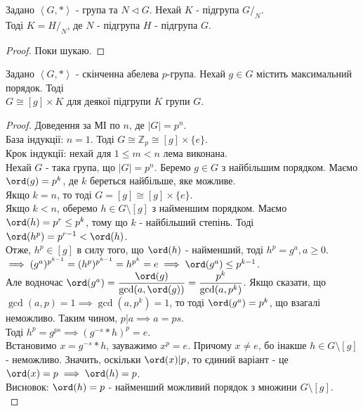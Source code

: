 \documentclass{math_library}
\begin{document}
\begin{lemma}
Задано $\left< G,*\right>$ - група та $N \triangleleft G$. Нехай $K$ - підгрупа $G/_N$. \\
Тоді $K = H/_N$, де $N$ - підгрупа $H$ - підгрупа $G$.
\end{lemma}

\begin{proof}
Поки шукаю.
\end{proof}

\begin{lemma}
Задано $\left< G, * \right>$ - скінченна абелева $p$-група. Нехай $g \in G$ містить максимальний порядок. Тоді\\
$G \cong [g] \times K$ для деякої підгрупи $K$ групи $G$.
\end{lemma}

\begin{proof}
Доведення за МІ по $n$, де $|G| = p^n$.\\
База індукції: $n = 1$. Тоді $G \cong \mathbb{Z}_p \cong [g] \times \{e\}$.\\
Крок індукції: нехай для $1 \leq m < n$ лема виконана.\\
Нехай $G$ - така група, що $|G| = p^n$. Беремо $g \in G$ з найбільшим порядком. Маємо $\ord(g) = p^k$, де $k$ береться найбільше, яке можливе.\\
Якщо $k = n$, то тоді $G = [g] \cong [g] \times \{e\}$.\\
Якщо $k < n$, оберемо $h \in G \setminus [g]$ з найменшим порядком. Маємо $\ord(h) = p^r \leq p^k$, тому що $k$ - найбільший степінь. Тоді $\ord(h^p) = p^{r-1} < \ord(h)$.\\
Отже, $h^p \in [g]$ в силу того, що $\ord(h)$ - найменший, тоді $h^p = g^a, a \geq 0$.\\
$\implies (g^a)^{p^{k-1}} = (h^p)^{p^{k-1}} = h^{p^k} = e \implies \ord(g^a) \leq p^{k-1}$.\\
Але водночас $\ord(g^a) = \dfrac{\ord(g)}{\gcd(a,\ord(g))} = \dfrac{p^k}{\gcd(a,p^k)}$. Якщо сказати, що $\gcd(a,p) = 1 \implies \gcd(a,p^k) = 1$, то тоді $\ord(g^a) = p^k$, що взагалі неможливо. Таким чином, $p | a \implies a = ps$.\\
Тоді $h^{p} = g^{ps} \implies (g^{-s}*h)^p = e$.\\
Встановимо $x = g^{-s}*h$, зауважимо $x^p = e$. Причому $x \neq e$, бо інакше $h \in G \setminus [g]$ - неможливо. Значить, оскільки $\ord(x) | p$, то єдиний варіант - це $\ord(x) = p \implies \ord(h) = p$.\\
Висновок: $\ord(h) = p$ - найменший можливий порядок з множини $G \setminus [g]$. \bigskip \\

\end{proof}
\end{document}
